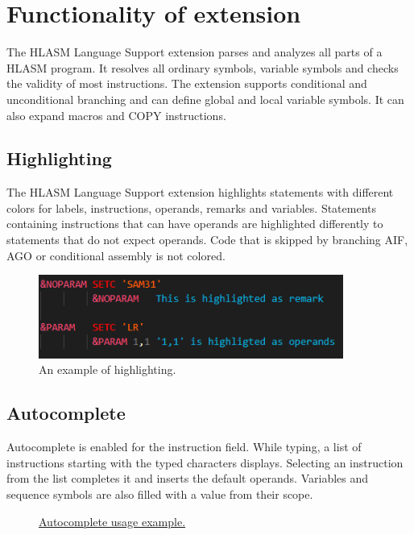 \chapter{Functionality of extension}
The HLASM Language Support extension parses and analyzes all parts of a HLASM program. It resolves all ordinary symbols, variable symbols and checks the validity of most instructions. The extension supports conditional and unconditional branching and can define global and local variable symbols. It can also expand macros and COPY instructions.

\section{Highlighting}
The HLASM Language Support extension highlights statements with different colors for labels, instructions, operands, remarks and variables. Statements containing instructions that can have operands are highlighted differently to statements that do not expect operands. Code that is skipped by branching AIF, AGO or conditional assembly is not colored.

\begin{figure}[h]
	\centering
	\includegraphics[width=10cm]{img/highligting}
	\caption{An example of highlighting.}
\end{figure}

\section{Autocomplete}
Autocomplete is enabled for the instruction field. While typing, a list of instructions starting with the typed characters displays. Selecting an instruction from the list completes it and inserts the default operands. Variables and sequence symbols are also filled with a value from their scope.

\begin{figure}[H]
	\centering
	\caption{\href{https://github.com/eclipse/che-che4z-lsp-for-hlasm/blob/master/readme\_res/autocomplete.gif}{Autocomplete usage example.}}
\end{figure}

